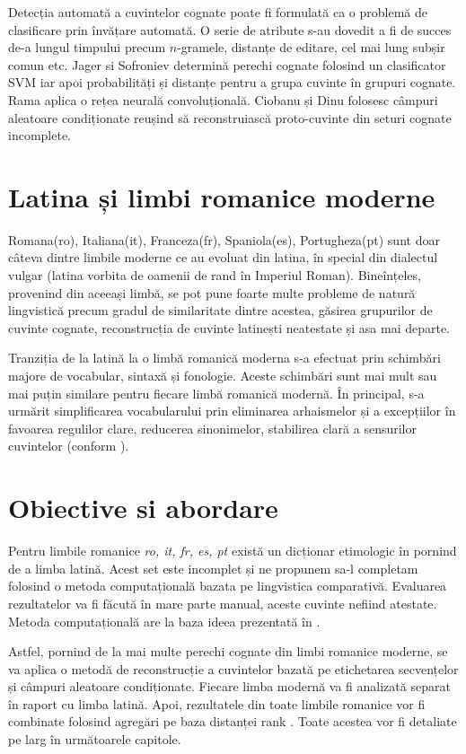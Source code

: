 Detecția automată a cuvintelor cognate poate fi formulată ca o problemă de clasificare prin învățare
automată. O serie de atribute s-au dovedit a fi de succes de-a lungul timpului precum $n$-gramele,
distanțe de editare, cel mai lung subșir comun etc. Jager si Sofroniev \cite{svmclass} determină
perechi cognate folosind un clasificator SVM iar apoi probabilități și distanțe pentru a grupa
cuvinte în grupuri cognate. Rama \cite{cnn} aplica o rețea neurală convoluțională. Ciobanu și Dinu
\cite{theone} folosesc câmpuri aleatoare condiționate reușind să reconstruiască proto-cuvinte din
seturi cognate incomplete.

\section{Latina și limbi romanice moderne}
Romana(ro), Italiana(it), Franceza(fr), Spaniola(es), Portugheza(pt) sunt doar câteva dintre limbile
moderne ce au evoluat din latina, în special din dialectul vulgar (latina vorbita de oamenii de rand 
în Imperiul Roman). Bineînțeles, provenind din aceeași limbă, se pot pune foarte multe probleme de 
natură lingvistică precum gradul de similaritate dintre acestea, găsirea grupurilor de cuvinte cognate,
reconstrucția de cuvinte latinești neatestate și asa mai departe.

Tranziția de la latină la o limbă romanică moderna s-a efectuat prin schimbări majore de vocabular, 
sintaxă și fonologie. Aceste schimbări sunt mai mult sau mai puțin similare pentru fiecare limbă
romanică modernă. În principal, s-a urmărit simplificarea vocabularului prin eliminarea arhaismelor
și a excepțiilor în favoarea regulilor clare, reducerea sinonimelor, stabilirea clară a sensurilor
cuvintelor (conform \cite{sala}).

\section{Obiective si abordare}
Pentru limbile romanice \textit{ro, it, fr, es, pt} există un dicționar etimologic în \cite{ripeanubook}
pornind de a limba latină. Acest set este incomplet și ne propunem sa-l completam folosind o metoda 
computațională bazata pe lingvistica comparativă. Evaluarea rezultatelor va fi făcută în mare parte
manual, aceste cuvinte nefiind atestate. Metoda computațională are la baza ideea prezentată în 
\cite{theone}.

Astfel, pornind de la mai multe perechi cognate din limbi romanice moderne, se va aplica o metodă
de reconstrucție a cuvintelor bazată pe etichetarea secvențelor și câmpuri aleatoare condiționate. 
Fiecare limba modernă va fi analizată separat în raport cu limba latină. Apoi, rezultatele din toate 
limbile romanice vor fi combinate folosind agregări pe baza distanței rank \cite{rankdistance}.
Toate acestea vor fi detaliate pe larg în următoarele capitole.

